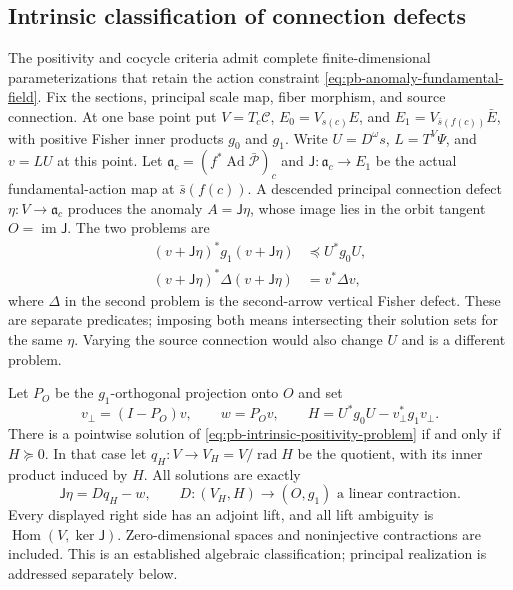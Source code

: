 \subsection{Intrinsic classification of connection defects}
\label{sec:pb-intrinsic-defect-classification}

The positivity and cocycle criteria admit complete finite-dimensional
parameterizations that retain the action constraint
\eqref{eq:pb-anomaly-fundamental-field}. Fix the sections, principal scale
map, fiber morphism, and source connection. At one base point put
$V=T_c\mathcal C$, $E_0=V_{s(c)}E$, and
$E_1=V_{\bar s(f(c))}\bar E$, with positive Fisher inner products
$g_0$ and $g_1$. Write $U=D^\omega s$, $L=T^V\Psi$, and $v=LU$ at this
point. Let $\mathfrak a_c=(f^*\operatorname{Ad}\bar{\mathscr P})_c$ and
$\mathsf J:\mathfrak a_c\to E_1$ be the actual fundamental-action map at
$\bar s(f(c))$. A descended principal connection defect
$\eta:V\to\mathfrak a_c$ produces the anomaly $A=\mathsf J\eta$, whose
image lies in the orbit tangent $O=\operatorname{im}\mathsf J$. The two
problems are
\begin{align}
(v+\mathsf J\eta)^*g_1(v+\mathsf J\eta)
&\preceq U^*g_0U,
\label{eq:pb-intrinsic-positivity-problem}\\
(v+\mathsf J\eta)^*\Delta(v+\mathsf J\eta)
&=v^*\Delta v,
\label{eq:pb-intrinsic-cocycle-problem}
\end{align}
where $\Delta$ in the second problem is the second-arrow vertical Fisher
defect. These are separate predicates; imposing both means intersecting
their solution sets for the same $\eta$. Varying the source connection
would also change $U$ and is a different problem. 

Let $P_O$ be the $g_1$-orthogonal projection onto $O$ and set
\begin{equation}
v_\perp=(I-P_O)v,\qquad w=P_Ov,\qquad
H=U^*g_0U-v_\perp^*g_1v_\perp.
\label{eq:pb-defect-positivity-budget}
\end{equation}
There is a pointwise solution of
\eqref{eq:pb-intrinsic-positivity-problem} if and only if $H\succeq0$.
In that case let $q_H:V\to V_H=V/\operatorname{rad}H$ be the quotient,
with its inner product induced by $H$. All solutions are exactly
\begin{equation}
\mathsf J\eta=Dq_H-w,\qquad
D:(V_H,H)\longrightarrow(O,g_1)
\text{ a linear contraction}.
\label{eq:pb-defect-contraction-parameterization}
\end{equation}
Every displayed right side has an adjoint lift, and all lift ambiguity is
$\operatorname{Hom}(V,\ker\mathsf J)$. Zero-dimensional spaces and
noninjective contractions are included. This is an established algebraic
classification; principal realization is addressed separately below.

